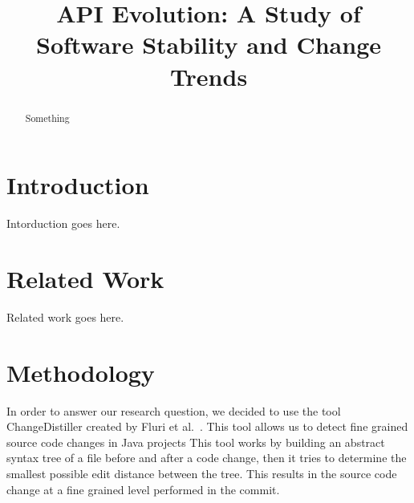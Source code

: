 \documentclass[conference]{IEEEtran}
\begin{document}
\title{API Evolution: A Study of Software Stability and Change Trends}

\author{
\and
{}
\and
{}
}

\maketitle

\begin{abstract}
Something
\end{abstract}

\section{Introduction}
Intorduction goes here.

\section{Related Work}
Related work goes here.

\section{Methodology}
In order to answer our research question, we decided to use the tool ChangeDistiller created by Fluri et al.~\cite{}. This tool allows us to detect fine grained
source code changes in Java projects This tool works by building an abstract syntax tree of a file before and after a code change, then it tries to determine
the smallest possible edit distance between the tree. This results in the source code change at a fine grained level performed in the commit.
\end{document}
